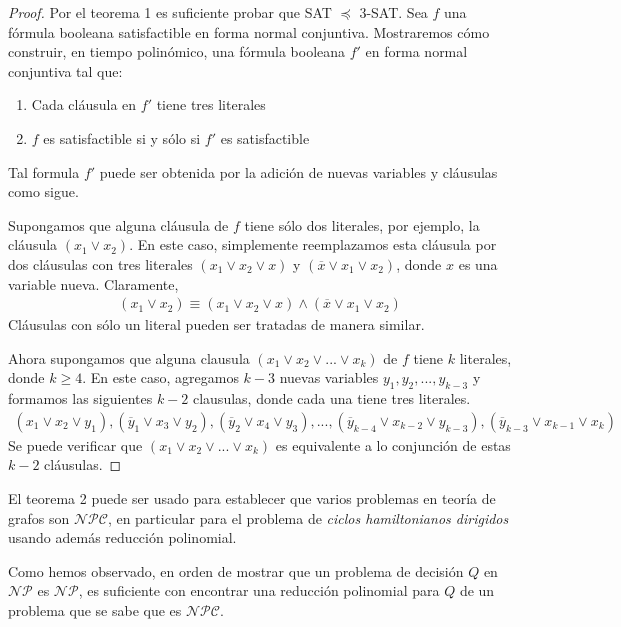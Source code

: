 \documentclass{article}
\begin{document}
\begin{proof}
Por el teorema 1
es suficiente probar que SAT $\preceq$ 3-SAT. Sea $f$ una
fórmula booleana satisfactible en forma normal conjuntiva.
Mostraremos cómo construir, en tiempo polinómico, una
fórmula booleana $f'$ en forma normal conjuntiva tal que:
\begin{enumerate}
\item Cada cláusula en $f'$ tiene tres literales
\item $f$ es satisfactible si y sólo si $f'$ es satisfactible
\end{enumerate}
\noindent Tal formula $f'$ puede ser obtenida por la adición
de nuevas variables y cláusulas como sigue.

Supongamos que alguna cláusula de $f$ tiene sólo dos literales,
por ejemplo, la cláusula $(x_1 \vee x_2)$. En este caso,
simplemente reemplazamos esta cláusula por dos cláusulas con
tres literales $(x_1 \vee x_2 \vee x)$ y 
$(\overline{x} \vee x_1 \vee x_2)$, donde $x$ es una variable
nueva. Claramente,
\begin{align*}
    (x_1 \vee x_2) \equiv (x_1 \vee x_2 \vee x) \land
    (\overline{x} \vee x_1 \vee x_2)
\end{align*}
Cláusulas con sólo un literal pueden ser tratadas de manera similar.

Ahora supongamos que alguna clausula 
$(x_1 \vee x_2 \vee ... \vee x_k)$ de $f$ tiene $k$ literales, donde
$k \geq 4$. En este caso, agregamos $k-3$ nuevas variables
$y_1,y_2,...,y_{k-3}$ y formamos las siguientes $k-2$ clausulas,
donde cada una tiene tres literales.
\begin{align*}
    (x_1 \vee x_2 \vee y_1), (\overline{y}_1 \vee x_3 \vee y_2),
    (\overline{y}_2 \vee x_4 \vee y_3),..., 
    (\overline{y}_{k-4} \vee x_{k-2} \vee y_{k-3}),
    (\overline{y}_{k-3} \vee x_{k-1} \vee x_k)
\end{align*}
Se puede verificar que $(x_1 \vee x_2 \vee ... \vee x_k)$ es
equivalente a lo conjunción de estas $k-2$ cláusulas.
\end{proof}

El teorema 2 puede ser usado para establecer que varios
problemas en teoría de grafos son $\mathcal{NPC}$, en particular
para el problema de \textit{ciclos hamiltonianos dirigidos}
usando además reducción polinomial.

Como hemos observado, en orden de mostrar que un problema
de decisión $Q$ en $\mathcal{NP}$ es $\mathcal{NP}$, es 
suficiente con encontrar una reducción polinomial para $Q$ de un
problema que se sabe que es $\mathcal{NPC}$.
\end{document}
